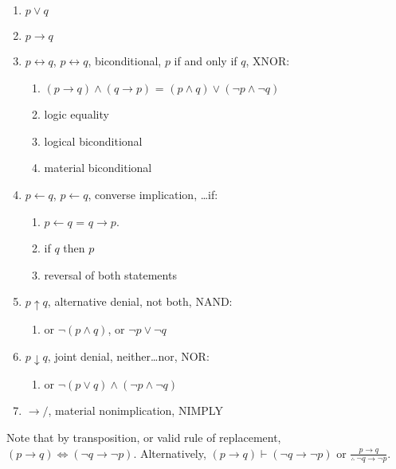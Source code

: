 \begin{enumerate}
\begin{enumerate}
\begin{enumerate}
		\item $p \lor q$
		\item $p \rightarrow q$
		\item $p \leftrightarrow q$, $p \longleftrightarrow q$, biconditional, $p$ if and only if $q$, XNOR: \vspace{-0.1cm}
			\begin{enumerate} \itemsep -1pt
			\item $(p \rightarrow q) \land (q \rightarrow p)$ = $(p \land q) \lor (\neg p \land \neg q)$
			\item logic equality
			\item logical biconditional
			\item material biconditional
			\end{enumerate}
		\item $p \leftarrow q$, $p \longleftarrow q$, converse implication, \dots if: \vspace{-0.1cm}
			\begin{enumerate} \itemsep -1pt
			\item $p \leftarrow q$ = $q \rightarrow p$.
			\item if $q$ then $p$
			\item reversal of both statements
			\end{enumerate}
		\item $p \uparrow q$, alternative denial, not both, NAND: \vspace{-0.1cm}
			\begin{enumerate} \itemsep -1pt
			\item or $\neg (p \land q)$, or $\neg p \lor \neg q$
			\end{enumerate}
		\item $p \downarrow q$, joint denial, neither\dots nor, NOR: \vspace{-0.1cm}
			\begin{enumerate} \itemsep -1pt
			\item or $\neg (p \lor q) \land (\neg p \land \neg q)$
			\end{enumerate}
		\item $\rightarrow/$, material nonimplication, NIMPLY
		\end{enumerate}
	\end{enumerate}
\end{enumerate}

Note that by transposition, or valid rule of replacement, $(p \rightarrow q) \Longleftrightarrow (\neg q \rightarrow \neg p)$. Alternatively, $(p \rightarrow q) \vdash (\neg q \rightarrow \neg p)$ or $\frac{p \rightarrow q}{\therefore\ \neg q \rightarrow \neg p}$.



